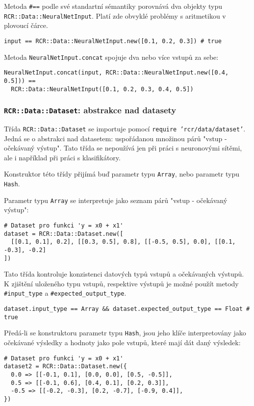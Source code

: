 \documentclass[a4paper]{article}
\begin{document}
Metoda \texttt{\#==} podle své standartní sémantiky porovnává dva objekty typu
\texttt{RCR::Data::NeuralNetInput}. Platí zde obvyklé problémy s aritmetikou
v plovoucí čárce.
\begin{lstlisting}
input == RCR::Data::NeuralNetInput.new([0.1, 0.2, 0.3]) # true
\end{lstlisting}

Metoda \texttt{NeuralNetInput.concat} spojuje dva nebo více vstupů za sebe:
\begin{lstlisting}
NeuralNetInput.concat(input, RCR::Data::NeuralNetInput.new([0.4, 0.5])) ==
  RCR::Data::NeuralNetInput([0.1, 0.2, 0.3, 0.4, 0.5])
\end{lstlisting}


\subsubsection{\texttt{RCR::Data::Dataset}: abstrakce nad datasety}
Třída \texttt{RCR::Data::Dataset} se importuje pomocí \texttt{require
'rcr/data/dataset'}. Jedná se o abstrakci nad datasetem: uspořádanou
množinou párů "vstup - očekávaný výstup". Tato třída se nepoužívá jen
při práci s neuronovými sítěmi, ale i například při práci s klasifikátory.

Konstruktor této třídy přijímá buď parametr typu \texttt{Array}, nebo parametr
typu \texttt{Hash}.

Parametr typu \texttt{Array} se interpretuje jako seznam
párů "vstup - očekávaný výstup":
\begin{lstlisting}
# Dataset pro funkci 'y = x0 + x1'
dataset = RCR::Data::Dataset.new([
  [[0.1, 0.1], 0.2], [[0.3, 0.5], 0.8], [[-0.5, 0.5], 0.0], [[0.1, -0.3], -0.2]
])
\end{lstlisting}

Tato třída kontroluje konzistenci datových typů vstupů a očekávaných výstupů.
K zjištění uloženého typu vstupů, respektive výstupů je možné použít metody
\texttt{#input\_type} a \texttt{#expected\_output\_type}.
\begin{lstlisting}
dataset.input_type == Array && dataset.expected_output_type == Float # true
\end{lstlisting}

Předá-li se konstruktoru parametr typu \texttt{Hash}, jsou jeho
klíče interpretovány jako očekávané výsledky a hodnoty jako
pole vstupů, které mají dát daný výsledek:
\begin{lstlisting}
# Dataset pro funkci 'y = x0 + x1'
dataset2 = RCR::Data::Dataset.new({
  0.0 => [[-0.1, 0.1], [0.0, 0.0], [0.5, -0.5]],
  0.5 => [[-0.1, 0.6], [0.4, 0.1], [0.2, 0.3]],
  -0.5 => [[-0.2, -0.3], [0.2, -0.7], [-0.9, 0.4]],
})
\end{lstlisting}
\end{document}

